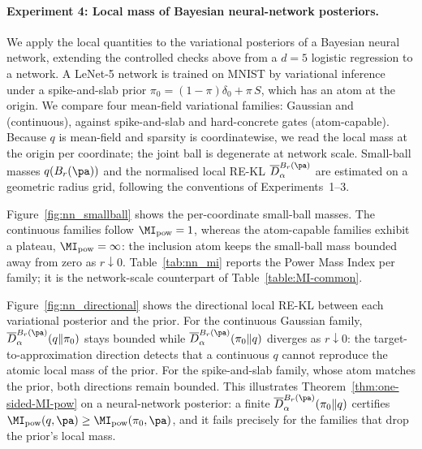 
\paragraph{Experiment 4: Local mass of Bayesian neural-network posteriors.}
{\color{blue}
We apply the local quantities to the variational posteriors of a Bayesian neural
network, extending the controlled checks above from a \(d=5\) logistic regression to a
network. A LeNet-5 network is trained on MNIST by variational inference under a
spike-and-slab prior \(\pi_0=(1-\pi)\delta_0+\pi\,S\), which has an atom at the origin. We
compare four mean-field variational families: Gaussian and 
(continuous), against spike-and-slab and hard-concrete gates (atom-capable).
Because
\(q\) is mean-field and sparsity is coordinatewise, we read the local mass at the origin
per coordinate; the joint ball is degenerate at network scale. Small-ball masses
\(q(B_r(\pa))\) and the normalised local RE-KL \(\overline D_\alpha^{B_r(\pa)}\) are
estimated on a geometric radius grid, following the conventions of Experiments~1--3.
}

{\color{blue}
Figure~\ref{fig:nn_smallball} shows the per-coordinate small-ball masses. The continuous
families follow \(\MI_{\mathrm{pow}}=1\), whereas the atom-capable families exhibit a
plateau, \(\MI_{\mathrm{pow}}=\infty\): the inclusion atom keeps the small-ball mass
bounded away from zero as \(r\downarrow0\). Table~\ref{tab:nn_mi} reports the Power Mass
Index per family; it is the network-scale counterpart of Table~\ref{table:MI-common}.
}

{\color{blue}
Figure~\ref{fig:nn_directional} shows the directional local RE-KL between each variational
posterior and the prior. For the continuous Gaussian family,
\(\overline D_\alpha^{B_r(\pa)}(q\|\pi_0)\) stays bounded while
\(\overline D_\alpha^{B_r(\pa)}(\pi_0\|q)\) diverges as \(r\downarrow0\): the
target-to-approximation direction detects that a continuous \(q\) cannot reproduce the
atomic local mass of the prior. For the spike-and-slab family, whose atom matches the
prior, both directions remain bounded. This illustrates
Theorem~\ref{thm:one-sided-MI-pow} on a neural-network posterior: a finite
\(\overline D_\alpha^{B_r(\pa)}(\pi_0\|q)\) certifies
\(\MI_{\mathrm{pow}}(q,\pa)\ge\MI_{\mathrm{pow}}(\pi_0,\pa)\), and it fails precisely for
the families that drop the prior's local mass.
}

